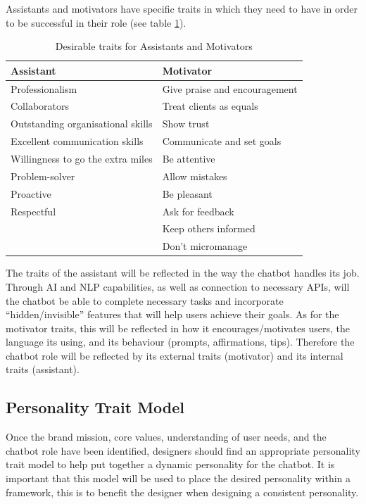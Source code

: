     Assistants and motivators have specific traits \citep{burge2016,lipcamon_2013} in which they need to have in order to be successful in their role (see table \ref{table:2}).
    
\vspace{2,5mm}

    \begin{table}[h]
    \begin{tabular}{ |p{}||p{}|  }
    \hline
    Assistant & Motivator \\
    \hline
        Professionalism & Give praise and encouragement \\
        Collaborators & Treat clients as equals \\
        Outstanding organisational skills & Show trust \\
        Excellent communication skills & Communicate and set goals \\
        Willingness to go the extra miles & Be attentive \\
        Problem-solver & Allow mistakes \\
        Proactive & Be pleasant \\
        Respectful & Ask for feedback \\
        & Keep others informed \\
        & Don’t micromanage \\
    \hline
    \end{tabular}
    \caption{Desirable traits for Assistants and Motivators}
    \label{table:2}
    \end{table}
 
    The traits of the assistant will be reflected in the way the chatbot handles its job. Through AI and NLP capabilities, as well as connection to necessary APIs, will the chatbot be able to complete necessary tasks and incorporate “hidden/invisible” features that will help users achieve their goals. As for the motivator traits, this will be reflected in how it encourages/motivates users, the language its using, and its behaviour (prompts, affirmations, tips). Therefore the chatbot role will be reflected by its external traits (motivator) and its internal traits (assistant).
    
\vspace{5mm}

    \subsection{Personality Trait Model}
    Once the brand mission, core values, understanding of user needs, and the chatbot role have been identified, designers should find an appropriate personality trait model to help put together a dynamic personality for the chatbot. It is important that this model will be used to place the desired personality within a framework, this is to benefit the designer when designing a consistent personality. 
    
